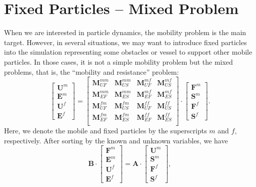 \documentclass{book}
\begin{document}
\section{Fixed Particles -- Mixed Problem}
When we are interested in particle dynamics,
the mobility problem is the main target.
However, in several situations, we may want to introduce
fixed particles into the simulation representing some
obstacles or vessel to support other mobile particles.
\cite{IchikiHayakawa1995}
In those cases, it is not a simple mobility problem but
the mixed problems, that is,
the ``mobility and resistance'' problem:
\begin{equation}
  \left[
    \begin{array}{c}
      \bm{U}^{m}\\
      \bm{E}^{m}\\
      \bm{U}^{f}\\
      \bm{E}^{f}
    \end{array}
  \right]
  =
  \left[
    \begin{array}{cccc}
      \bm{M}_{UF}^{mm} & \bm{M}_{US}^{mm} & \bm{M}_{UF}^{mf} & \bm{M}_{US}^{mf}\\
      \bm{M}_{EF}^{mm} & \bm{M}_{ES}^{mm} & \bm{M}_{EF}^{mf} & \bm{M}_{ES}^{mf}\\
      \bm{M}_{UF}^{fm} & \bm{M}_{US}^{fm} & \bm{M}_{UF}^{ff} & \bm{M}_{US}^{ff}\\
      \bm{M}_{EF}^{fm} & \bm{M}_{ES}^{fm} & \bm{M}_{EF}^{ff} & \bm{M}_{ES}^{ff}\\
    \end{array}
  \right]
  \cdot
  \left[
    \begin{array}{c}
      \bm{F}^{m}\\
      \bm{S}^{m}\\
      \bm{F}^{f}\\
      \bm{S}^{f}
    \end{array}
  \right]
  .
\end{equation}
Here, we denote the mobile and fixed particles by
the superscripts $m$ and $f$, respectively.
After sorting by the known and unknown variables,
we have
\begin{equation}
  \bm{B}
  \cdot
  \left[
    \begin{array}{c}
      \bm{F}^{m}\\
      \bm{E}^{m}\\
      \bm{U}^{f}\\
      \bm{E}^{f}
    \end{array}
  \right]
  =
  \bm{A}
  \cdot
  \left[
    \begin{array}{c}
      \bm{U}^{m}\\
      \bm{S}^{m}\\
      \bm{F}^{f}\\
      \bm{S}^{f}
    \end{array}
  \right]
  ,
  \label{eq:atimes-gen}
\end{equation}
\end{document}

